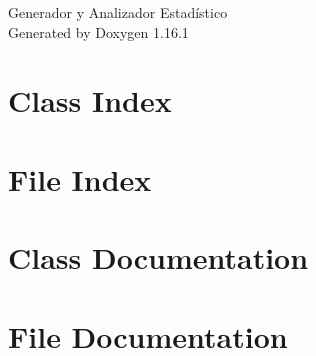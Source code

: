 \documentclass[twoside]{book}
\newcommand{\+}{\discretionary{\mbox{\scriptsize$\hookleftarrow$}}{}{}}
\newcommand{\clearemptydoublepage}{%
    \newpage{\pagestyle{empty}\cleardoublepage}%
  }
\begin{document}
  \raggedbottom
    \hypersetup{pageanchor=false,
                bookmarksnumbered=true,
                pdfencoding=unicode
               }
  \begin{titlepage}
  \vspace*{7cm}
  \begin{center}%
  {\Large Generador y Analizador Estadístico}\\
  \vspace*{1cm}
  {\large Generated by Doxygen 1.16.1}\\
  \end{center}
  \end{titlepage}
  \clearemptydoublepage
  \tableofcontents
  \clearemptydoublepage
  \hypersetup{pageanchor=true}

\chapter{Class Index}

\chapter{File Index}

\chapter{Class Documentation}


\chapter{File Documentation}









  \backmatter
  \newpage
  \clearemptydoublepage
  \printindex
\end{document}

